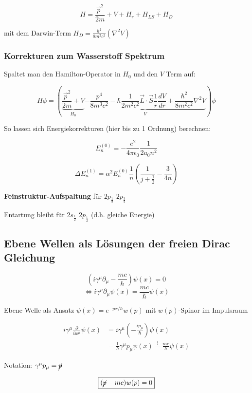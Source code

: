 \[H= \frac{\vec p^2}{2m}+V+H_r+H_{LS}+H_D\]


mit dem Darwin-Term \(H_D=\frac{h^2}{8m^2c^2}(\nabla^2 V)\)




\subsubsection{Korrekturen zum Wasserstoff Spektrum}

Spaltet man den Hamilton-Operator in \(H_0\) und den \(V\) Term auf:

\[H\phi=(\underbrace{\frac{\vec p^2}{2m}+V}_{H_0}\underbrace{ - \frac{p^4}{8m^3c^2} - \hbar \frac{1}{2m^2c^2}\vec L\cdot\vec S\frac{1}{r}\frac{dV}{dr} + \frac{\hbar^2}{8m^2c^2}\nabla^2 V}_{V})\phi\]

So lassen sich Energiekorrekturen (hier bis zu 1 Ordnung) berechnen:

\[E^{(0)}_n = -\frac{e^2}{4\pi\epsilon_0}\frac{1}{2a_0n^2}\]

\[\Delta E^{(1)}_n = \alpha^2 E^{(0)}_n \frac{1}{n}(\frac{1}{j+\frac{1}{2}}-\frac{3}{4n}) \]

\textbf{Feinstruktur-Aufspaltung} für  \(2p_{\frac{1}{2}}\)  \(2p_{\frac{3}{2}}\)

Entartung bleibt für \(2s_{\frac{1}{2}}\)  \(2p_{\frac{1}{2}}\) (d.h. gleiche Energie)


\subsection{Ebene Wellen als Lösungen der freien Dirac Gleichung}


\[\left(i\gamma^\mu\partial_\mu-\frac{mc}{\hbar}\right)\psi(x) = 0\]
\[ \Leftrightarrow  i\gamma^\mu\partial_\mu\psi(x) = \frac{mc}{\hbar}\psi(x) \]

Ebene Welle als Ansatz \(\psi(x) = e^{-px/\hbar}w(p)\) mit \(w(p)\)-Spinor im Impulsraum

\begin{align}
i\gamma^\mu\frac{\partial}{\partial x^\mu}\psi(x) &= i\gamma^\mu(-\frac{ip_\mu}{\hbar})\psi(x)\\
&=\frac{1}{\hbar}\gamma^\mu p_\mu \psi(x)  \stackrel{\mathrm{!}}= \frac{mc}{\hbar}\psi(x)
\end{align}

Notation: \(\gamma^\mu p_\mu = \cancel p\)



\begin{equation}
  \label{eq:6}
  \boxed{(\cancel p - mc)w(p) = 0}
\end{equation}

